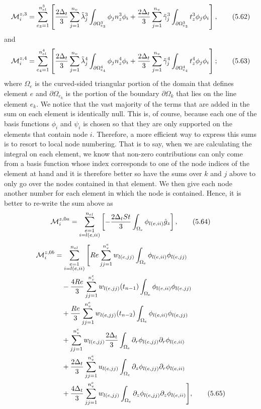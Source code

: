 \documentclass{article}
\begin{document}
\begin{align}
\mathcal{M}_i^{z,3} = \sum_{e_3=1}^{n_{el}^3} \left[ \frac{2\Delta_t}{3} \sum_{j=1}^{n_v} \tilde{\lambda}_j^3 \int_{\partial \Omega_{e_3}^3} \phi_j n_z^3 \phi_i + \frac{2\Delta_t}{3} \sum_{j=1}^{n_v} \tilde{\gamma}_j^3 \int_{\partial \Omega_{e_3}^3} t_z^3 \phi_j \phi_i \right], \tag{5.62}
\end{align}
and
\begin{align}
\mathcal{M}_i^{z,4} = \sum_{e_4=1}^{n_{el}^4} \left[ \frac{2\Delta_t}{3} \sum_{j=1}^{n_v} \tilde{\lambda}_j^4 \int_{\partial \Omega_{e_4}^4} \phi_j n_z^4 \phi_i + \frac{2\Delta_t}{3} \sum_{j=1}^{n_v} \tilde{\gamma}_j^4 \int_{\partial \Omega_{e_4}^4} t_z^4 \phi_j \phi_i \right]; \tag{5.63}
\end{align}
where $\Omega_e$ is the curved-sided triangular portion of the domain that defines element $e$ and $\partial \Omega_{e_k}$ is the portion of the boundary $\partial \Omega_k$ that lies on the line element $e_k$. We notice that the vast majority of the terms that are added in the sum on each element is identically null. This is, of course, because each one of the basis functions $\phi_i$ and $\psi_i$ is chosen so that they are only supported on the elements that contain node $i$. Therefore, a more efficient way to express this sums is to resort to local node numbering. That is to say, when we are calculating the integral on each element, we know that non-zero contributions can only come from a basis function whose index corresponds to one of the node indices of the element at hand and it is therefore better so have the sums over $k$ and $j$ above to only go over the nodes contained in that element. We then give each node another number for each element in which the node is contained. Hence, it is better to re-write the sum above as
\begin{equation}
\mathcal{M}_i^{z,0a} = \sum_{\substack{e=1\\ i=l(e,ii)}}^{n_{el}} \left[ -\frac{2\Delta_t St}{3} \int_{\Omega_e} \phi_{l(e,ii)} \hat{g}_z \right], \tag{5.64}
\end{equation}
\begin{align}
\mathcal{M}_i^{z,0b} &= \sum_{\substack{e=1\\ i=l(e,ii)}}^{n_{el}} \Bigg[ Re \sum_{jj=1}^{n_v^e} w_{l(e,jj)} \int_{\Omega_e} \phi_{l(e,ii)} \phi_{l(e,jj)} \nonumber\\
&\quad - \frac{4Re}{3} \sum_{jj=1}^{n_v^e} w_{l(e,jj)}(t_{n-1}) \int_{\Omega_e} \phi_{l(e,ii)} \phi_{l(e,jj)} \nonumber\\
&\quad + \frac{Re}{3} \sum_{jj=1}^{n_v^e} w_{l(e,jj)}(t_{n-2}) \int_{\Omega_e} \phi_{l(e,ii)} \phi_{l(e,jj)} \nonumber\\
&\quad + \sum_{jj=1}^{n_v^e} w_{l(e,jj)} \frac{2\Delta_t}{3} \int_{\Omega_e} \partial_r \phi_{l(e,jj)} \partial_r \phi_{l(e,ii)} \nonumber\\
&\quad + \frac{2\Delta_t}{3} \sum_{jj=1}^{n_v^e} u_{l(e,jj)} \int_{\Omega_e} \partial_z \phi_{l(e,jj)} \partial_r \phi_{l(e,ii)} \nonumber\\
&\quad + \frac{4\Delta_t}{3} \sum_{jj=1}^{n_v^e} w_{l(e,jj)} \int_{\Omega_e} \partial_z \phi_{l(e,jj)} \partial_z \phi_{l(e,ii)} \Bigg], \tag{5.65}
\end{align}
\end{document}
